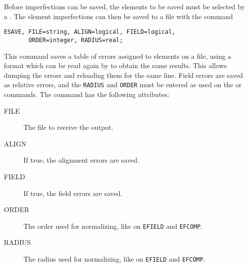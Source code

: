 Before imperfections can be saved, 
the elements to be saved must be selected by a
.
The element imperfections can then be saved to a file with the command
\begin{verbatim}
ESAVE, FILE=string, ALIGN=logical, FIELD=logical,
       ORDER=integer, RADIUS=real;
\end{verbatim}
This command saves a table of errors assigned to elements on a file,
using a format which can be read again by \opal to obtain the same results.
This allows dumping the errors and reloading them for the same line.
Field errors are saved as relative errors,
and the \texttt{RADIUS} and \texttt{ORDER} must be entered as used on the
 or 
 commands.
The command has the following attributes:
\begin{description}
\item[FILE]
  The file to receive the output.
\item[ALIGN]
  If true, the alignment errors are saved.
\item[FIELD]
  If true, the field errors are saved.
\item[ORDER]
  The order used for normalizing, like on \texttt{EFIELD} and
  \texttt{EFCOMP}. 
\item[RADIUS]
  The radius used for normalizing, like on \texttt{EFIELD} and
  \texttt{EFCOMP}.
\end{description}

